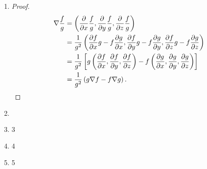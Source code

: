 \documentclass[a4paper, 11pt]{ctexart}
\begin{document}
\begin{enumerate}
    \item %
        \begin{proof}
            \begin{align*}
                \nabla\frac{f}{g} &= \left(\frac{\partial}{\partial{x}}\frac{f}{g}, \frac{\partial}{\partial{y}}\frac{f}{g}, \frac{\partial}{\partial{z}}\frac{f}{g}\right) \\
                &= \frac{1}{g^2}\left(\frac{\partial{f}}{\partial{x}}g - f\frac{\partial{g}}{\partial{x}}, \frac{\partial{f}}{\partial{y}}g - f\frac{\partial{g}}{\partial{y}}, \frac{\partial{f}}{\partial{z}}g - f\frac{\partial{g}}{\partial{z}}\right) \\
                &= \frac{1}{g^2}\left[g\left(\frac{\partial{f}}{\partial{x}}, \frac{\partial{f}}{\partial{y}}, \frac{\partial{f}}{\partial{z}}\right) - f\left(\frac{\partial{g}}{\partial{x}}, \frac{\partial{g}}{\partial{y}}, \frac{\partial{g}}{\partial{z}}\right)\right] \\
                &= \frac{1}{g^2}\left(g\nabla{f} - f\nabla{g}\right). \qedhere
            \end{align*}
        \end{proof}
    \item %
    \item 3
    \item 4
    \item 5
\end{enumerate}
\end{document}
